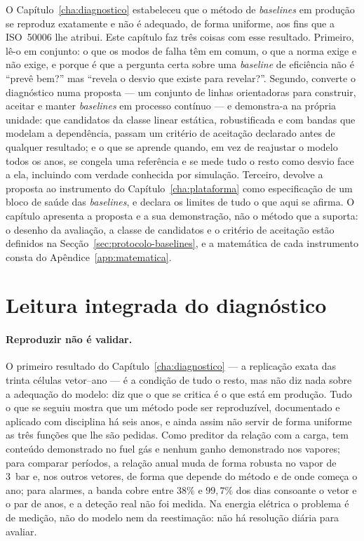 O Capítulo~\ref{cha:diagnostico} estabeleceu que o método de \emph{baselines}
em produção se reproduz exatamente e não é adequado, de forma uniforme, aos
fins que a ISO~50006 lhe atribui. Este capítulo faz três coisas com esse
resultado. Primeiro, lê-o em conjunto: o que os modos de falha têm em
comum, o que a norma exige e não exige, e porque é que a pergunta certa
sobre uma \emph{baseline} de eficiência não é ``prevê bem?'' mas ``revela o
desvio que existe para revelar?''. Segundo, converte o diagnóstico numa
proposta --- um conjunto de linhas orientadoras para construir, aceitar e
manter \emph{baselines} em processo contínuo --- e demonstra-a na própria
unidade: que candidatos da classe linear estática, robustificada e com
bandas que modelam a dependência, passam um critério de aceitação declarado antes de
qualquer resultado; e o que se aprende quando, em vez de reajustar o modelo
todos os anos, se congela uma referência e se mede tudo o resto como desvio
face a ela, incluindo com verdade conhecida por simulação. Terceiro,
devolve a proposta ao instrumento do Capítulo~\ref{cha:plataforma} como
especificação de um bloco de saúde das \emph{baselines}, e declara os
limites de tudo o que aqui se afirma. O capítulo apresenta a proposta e a sua
demonstração, não o método que a suporta: o desenho da avaliação, a classe de
candidatos e o critério de aceitação estão definidos na
Secção~\ref{sec:protocolo-baselines}, e a matemática de cada instrumento
consta do Apêndice~\ref{app:matematica}.

\section{Leitura integrada do diagnóstico}
\label{sec:leitura-integrada}

\paragraph{Reproduzir não é validar.} O primeiro resultado do
Capítulo~\ref{cha:diagnostico} --- a replicação exata das trinta células
vetor--ano --- é a condição de tudo o resto, mas não diz nada sobre a
adequação do modelo: diz que o que se critica é o que está em produção.
Tudo o que se seguiu mostra que um método pode ser reproduzível, documentado
e aplicado com disciplina há seis anos, e ainda assim não servir de forma
uniforme as três funções que lhe são pedidas. Como preditor da relação com a
carga, tem conteúdo demonstrado no fuel gás e nenhum ganho demonstrado nos
vapores; para comparar períodos, a relação anual muda de forma robusta no
vapor de 3~bar e, nos outros vetores, de forma que depende do método e de
onde começa o ano; para alarmes, a banda cobre entre $38\%$ e $99{,}7\%$ dos
dias consoante o vetor e o par de anos, e a deteção real não foi medida. Na
energia elétrica o problema é de medição, não do modelo nem da
reestimação: não há resolução diária para avaliar.


